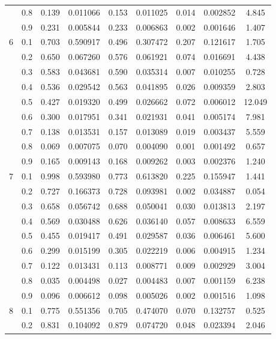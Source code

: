 \begin{longtable}{ | c | c || c | c | c | c | c | c | c | }
 & 0.8 & 0.139 & 0.011066 & 0.153 & 0.011025 & 0.014 & 0.002852 & 4.845 \\
 & 0.9 & 0.231 & 0.005844 & 0.233 & 0.006863 & 0.002 & 0.001646 & 1.407 \\
 \hline
\multirow{9}{*}{6} & 0.1 & 0.703 & 0.590917 & 0.496 & 0.307472 & 0.207 & 0.121617 & 1.705 \\
 & 0.2 & 0.650 & 0.067260 & 0.576 & 0.061921 & 0.074 & 0.016691 & 4.438 \\
 & 0.3 & 0.583 & 0.043681 & 0.590 & 0.035314 & 0.007 & 0.010255 & 0.728 \\
 & 0.4 & 0.536 & 0.029542 & 0.563 & 0.041895 & 0.026 & 0.009359 & 2.803 \\
 & 0.5 & 0.427 & 0.019320 & 0.499 & 0.026662 & 0.072 & 0.006012 & 12.049 \\
 & 0.6 & 0.300 & 0.017951 & 0.341 & 0.021931 & 0.041 & 0.005174 & 7.981 \\
 & 0.7 & 0.138 & 0.013531 & 0.157 & 0.013089 & 0.019 & 0.003437 & 5.559 \\
 & 0.8 & 0.069 & 0.007075 & 0.070 & 0.004090 & 0.001 & 0.001492 & 0.657 \\
 & 0.9 & 0.165 & 0.009143 & 0.168 & 0.009262 & 0.003 & 0.002376 & 1.240 \\
 \hline
\multirow{9}{*}{7} & 0.1 & 0.998 & 0.593980 & 0.773 & 0.613820 & 0.225 & 0.155947 & 1.441 \\
 & 0.2 & 0.727 & 0.166373 & 0.728 & 0.093981 & 0.002 & 0.034887 & 0.054 \\
 & 0.3 & 0.658 & 0.056742 & 0.688 & 0.050041 & 0.030 & 0.013813 & 2.197 \\
 & 0.4 & 0.569 & 0.030488 & 0.626 & 0.036140 & 0.057 & 0.008633 & 6.559 \\
 & 0.5 & 0.455 & 0.019417 & 0.491 & 0.029587 & 0.036 & 0.006461 & 5.600 \\
 & 0.6 & 0.299 & 0.015199 & 0.305 & 0.022219 & 0.006 & 0.004915 & 1.234 \\
 & 0.7 & 0.122 & 0.013431 & 0.113 & 0.008771 & 0.009 & 0.002929 & 3.004 \\
 & 0.8 & 0.035 & 0.004498 & 0.027 & 0.004483 & 0.007 & 0.001159 & 6.238 \\
 & 0.9 & 0.096 & 0.006612 & 0.098 & 0.005026 & 0.002 & 0.001516 & 1.098 \\
 \hline
\multirow{9}{*}{8} & 0.1 & 0.775 & 0.551356 & 0.705 & 0.474070 & 0.070 & 0.132757 & 0.525 \\
 & 0.2 & 0.831 & 0.104092 & 0.879 & 0.074720 & 0.048 & 0.023394 & 2.046 \\

\end{longtable}
